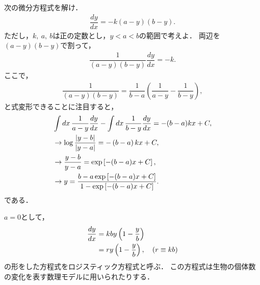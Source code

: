 \newpage
%
\gl
\reidai
次の微分方程式を解け．
\begin{align}
 \dfrac{dy}{dx} = -k \left(a-y\right)\left(b-y\right). 
\end{align}
ただし，$k,~a,~b$は正の定数とし，$y<a<b$の範囲で考えよ．
\gl
両辺を$(a-y)(b-y)$で割って，
\begin{align}
 \dfrac{1}{(a-y)(b-y)}\dfrac{dy}{dx} = -k. 
\end{align}
ここで，
\begin{align}
 \dfrac{1}{(a-y)(b-y)} = \dfrac{1}{b-a}\left(\dfrac{1}{a-y} - \dfrac{1}{b-y}\right),
\end{align}
と式変形できることに注目すると，
\begin{align}
 & \int dx\,\dfrac{1}{a-y}\dfrac{dy}{dx} - \int dx\, \dfrac{1}{b-y}\dfrac{dy}{dx}
 =  - (b-a)k x + C, \notag \\
 & \rightarrow \log \dfrac{\left|y-b\right|}{\left|y-a\right|} = -\left(b-a\right)kx + C,
 \notag \\
 & \rightarrow \dfrac{y-b}{y-a} = \exp\left[-(b-a)x + C \right], \notag \\
 & \rightarrow y = \dfrac{b-a\exp\left[-(b-a)x + C\right]}{1-\exp\left[-(b-a)x + C\right]}.
\end{align}
である．\\

$a=0$として，
\begin{align}
 \dfrac{dy}{dx} & = kby\left(1-\dfrac{y}{b}\right) \notag \\
                & = r y \left(1-\dfrac{y}{b}\right), \quad (r \equiv kb) 
\end{align}
の形をした方程式をロジスティック方程式と呼ぶ．
この方程式は生物の個体数の変化を表す数理モデルに用いられたりする．

\newpage
%

